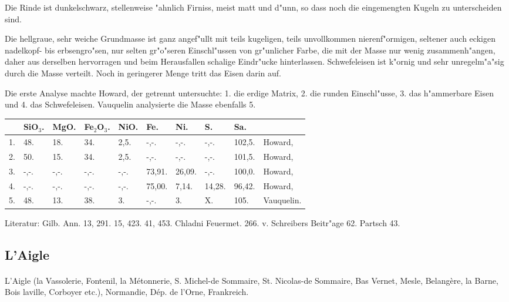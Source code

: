 \documentclass[a4paper, 11pt, oneside]{article}
\begin{document}
Die Rinde ist dunkelschwarz, stellenweise "ahnlich Firniss, meist matt und d"unn, so dass noch die eingemengten Kugeln zu unterscheiden sind.

Die hellgraue, sehr weiche Grundmasse ist ganz angef"ullt mit teils kugeligen, teils unvollkommen nierenf"ormigen, seltener auch eckigen nadelkopf- bis erbsengro"sen, nur selten gr"o"seren Einschl"ussen von gr"unlicher Farbe, die mit der Masse nur wenig zusammenh"angen, daher aus derselben hervorragen und beim Herausfallen schalige Eindr"ucke hinterlassen. Schwefeleisen ist k"ornig und sehr unregelm"a"sig durch die Masse verteilt. Noch in geringerer Menge tritt das Eisen darin auf.

Die erste Analyse machte Howard, der getrennt untersuchte: 1. die erdige Matrix, 2. die runden Einschl"usse, 3. das h"ammerbare Eisen und 4. das Schwefeleisen. Vauquelin analysierte die Masse ebenfalls 5.
\begin{table}[!ht]
    \centering
    \footnotesize
    \begin{tabular}{l l l l l l l l l l}
         & SiO$_{3}$. & MgO. & Fe$_{2}$O$_{3}$. & NiO. & Fe. & Ni. & S. & Sa. &  \\ \hline
        1. & 48. & 18. & 34. & 2,5. & -,-. & -,-. & -,-. & 102,5. & Howard, \\
        2. & 50. & 15. & 34. & 2,5. & -,-. & -,-. & -,-. & 101,5. & Howard, \\
        3. & -,-. & -,-. & -,-. & -,-. & 73,91. & 26,09. & -,-. & 100,0. & Howard, \\
        4. & -,-. & -,-. & -,-. & -,-. & 75,00. & 7,14. & 14,28. & 96,42. & Howard, \\
        5. & 48. & 13. & 38. & 3. & -,-. & 3. & X. & 105. & Vauquelin. \\
    \end{tabular}
\end{table}

\footnotesize
Literatur: Gilb. Ann. 13, 291. 15, 423. 41, 453. Chladni Feuermet. 266. v. Schreibers Beitr"age 62. Partsch 43.
\subsection{L'Aigle}
\normalsize
\paragraph{}
L'Aigle (la Vassolerie, Fontenil, la Métonnerie, S. Michel-de Sommaire, St. Nicolas-de Sommaire, Bas Vernet, Mesle, Belangère, la Barne, Bois laville, Corboyer etc.), Normandie, Dép. de l'Orne, Frankreich.
\end{document}
